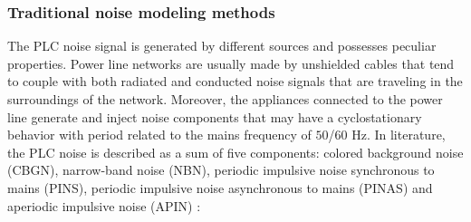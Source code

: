 \subsubsection{Traditional noise modeling methods}
The PLC noise signal is generated by different sources and
possesses peculiar properties. Power line networks are
usually made by unshielded cables that tend to couple with
both radiated and conducted noise signals that are traveling
in the surroundings of the network. Moreover, the appliances
connected to the power line generate and inject noise components that
may have a cyclostationary behavior with period related to the
mains frequency of $50$/$60$ Hz.
In literature, the PLC noise is described as a sum of
five components: colored background noise (CBGN), narrow-band noise (NBN), periodic impulsive noise synchronous
to mains (PINS), periodic impulsive noise asynchronous
to mains (PINAS) and aperiodic impulsive noise (APIN) \cite{Zimmermann2002}:
